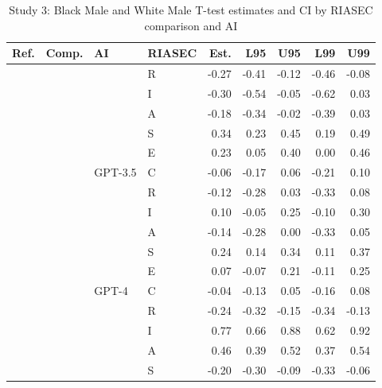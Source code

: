 \begin{table}

\caption{Study 3: Black Male and White Male T-test estimates and CI by RIASEC comparison and AI}
\centering
\fontsize{8}{10}\selectfont
\begin{tabular}[t]{llllrrrrr}
\toprule
Ref. & Comp. & AI & RIASEC & Est. & L95 & U95 & L99 & U99\\
\midrule
 &  &  & R & -0.27 & -0.41 & -0.12 & -0.46 & -0.08\\

 &  &  & I & -0.30 & -0.54 & -0.05 & -0.62 & 0.03\\

 &  &  & A & -0.18 & -0.34 & -0.02 & -0.39 & 0.03\\

 &  &  & S & 0.34 & 0.23 & 0.45 & 0.19 & 0.49\\

 &  &  & E & 0.23 & 0.05 & 0.40 & 0.00 & 0.46\\

 &  & \multirow[t]{-6}{*}{\raggedright\arraybackslash GPT-3.5} & C & -0.06 & -0.17 & 0.06 & -0.21 & 0.10\\

 &  &  & R & -0.12 & -0.28 & 0.03 & -0.33 & 0.08\\

 &  &  & I & 0.10 & -0.05 & 0.25 & -0.10 & 0.30\\

 &  &  & A & -0.14 & -0.28 & 0.00 & -0.33 & 0.05\\

 &  &  & S & 0.24 & 0.14 & 0.34 & 0.11 & 0.37\\

 &  &  & E & 0.07 & -0.07 & 0.21 & -0.11 & 0.25\\

 &  & \multirow[t]{-6}{*}{\raggedright\arraybackslash GPT-4} & C & -0.04 & -0.13 & 0.05 & -0.16 & 0.08\\

 &  &  & R & -0.24 & -0.32 & -0.15 & -0.34 & -0.13\\

 &  &  & I & 0.77 & 0.66 & 0.88 & 0.62 & 0.92\\

 &  &  & A & 0.46 & 0.39 & 0.52 & 0.37 & 0.54\\

 &  &  & S & -0.20 & -0.30 & -0.09 & -0.33 & -0.06\\


\end{tabular}
\end{table}
